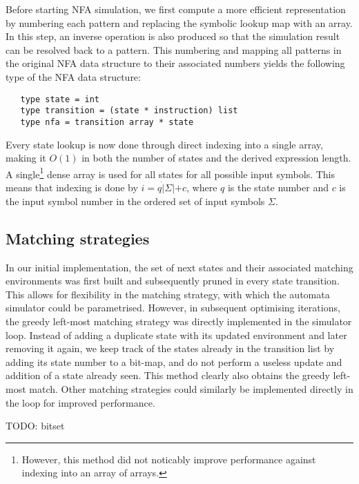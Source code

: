 Before starting NFA simulation, we first compute a more efficient representation
by numbering each pattern and replacing the symbolic lookup map with an array.
In this step, an inverse operation is also produced so that the simulation
result can be resolved back to a pattern. This numbering and mapping all
patterns in the original NFA data structure to their associated numbers yields
the following type of the NFA data structure:

\begin{lstlisting}
   type state = int
   type transition = (state * instruction) list
   type nfa = transition array * state
\end{lstlisting}

Every state lookup is now done through direct indexing into a single array,
making it $O(1)$ in both the number of states and the derived expression length.
A single\footnote{However, this method did not noticably improve performance
against indexing into an array of arrays.} dense array is used for all states
for all possible input symbols. This means that indexing is done by $i = q \dot
|\Sigma| + c$, where $q$ is the state number and $c$ is the input symbol number
in the ordered set of input symbols $\Sigma$.


\subsection{Matching strategies}

In our initial implementation, the set of next states and their associated
matching environments was first built and subsequently pruned in every state
transition. This allows for flexibility in the matching strategy, with which the
automata simulator could be parametrised. However, in subsequent optimising
iterations, the greedy left-most matching strategy was directly implemented in
the simulator loop. Instead of adding a duplicate state with its updated
environment and later removing it again, we keep track of the states already in
the transition list by adding its state number to a bit-map, and do not perform
a useless update and addition of a state already seen. This method clearly also
obtains the greedy left-most match. Other matching strategies could similarly be
implemented directly in the loop for improved performance.

TODO: bitset

